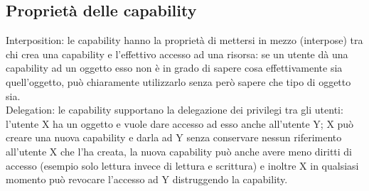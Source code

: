 \subsection{Proprietà delle capability}
Interposition: le capability hanno la proprietà di mettersi in mezzo (interpose) tra chi crea una capability e l'effettivo accesso ad una risorsa: se un utente dà una capability ad un oggetto esso non è in grado di sapere cosa effettivamente sia quell'oggetto, può chiaramente utilizzarlo senza però sapere che tipo di oggetto sia.\\
Delegation: le capability supportano la delegazione dei privilegi tra gli utenti: l'utente X ha un oggetto e vuole dare accesso ad esso anche all'utente Y; X può creare una nuova capability e darla ad Y senza conservare nessun riferimento all'utente X che l'ha creata, la nuova capability può anche avere meno diritti di accesso (esempio solo lettura invece di lettura e scrittura) e inoltre X in qualsiasi momento può revocare l'accesso ad Y distruggendo la capability.

